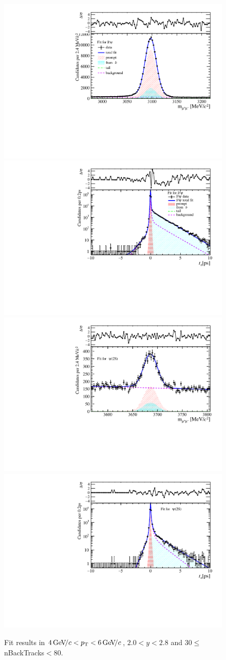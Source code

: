 \begin{figure}[H]
\begin{center}
\includegraphics[width=0.47\linewidth]{pdf/Jpsi/drawmassB/n5y1pt3.pdf}
\includegraphics[width=0.47\linewidth]{pdf/Jpsi/2DFitB/n5y1pt3.pdf}
\vspace*{-0.5cm}
\includegraphics[width=0.47\linewidth]{pdf/Psi2S/drawmassB/n5y1pt3.pdf}
\includegraphics[width=0.47\linewidth]{pdf/Psi2S/2DFitB/n5y1pt3.pdf}
\vspace*{-0.5cm}
\end{center}
\caption{Fit results in $4\text{\,Ge\kern -0.1em V\!/}c<p_{\mathrm{T}}<6\text{\,Ge\kern -0.1em V\!/}c$, $2.0<y<2.8$ and 30$\leq$nBackTracks$<$80.}
\label{Fitn5y1pt3}
\end{figure}
